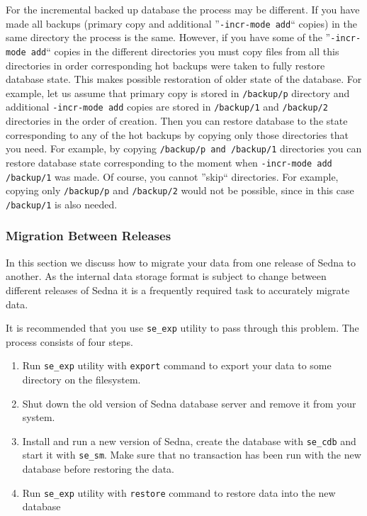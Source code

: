 \documentclass[a4paper,12pt]{article}
\begin{document}
For the incremental backed up database the process may be different. If you have made all backups (primary copy and 
additional ''\verb!-incr-mode add!`` copies) in the same directory the process is the same. However, if you have some of the 
''\verb!-incr-mode add!`` copies in the different directories you must copy files from all this directories 
in order corresponding hot backups were taken to fully restore
database state. This makes possible restoration of older state of the database. For example, let us assume
that primary copy is stored in \verb!/backup/p! directory and additional \verb!-incr-mode add! copies are stored in 
\verb!/backup/1! and \verb!/backup/2! directories in the order of creation. Then you can restore 
database to the state corresponding to any of the hot backups by copying only those directories that you need.
For example, by copying \verb!/backup/p and !\verb!/backup/1! directories you can restore database state corresponding
to the moment when \verb!-incr-mode add /backup/1! was made. Of course, you cannot ''skip`` directories. For example,
copying only \verb!/backup/p! and \verb!/backup/2! would not be possible, since in this case \verb!/backup/1! is also
needed.

\subsubsection{Migration Between Releases}
\label{sec:release-migr}
In this section we discuss how to migrate your data from one release of Sedna to another. 
As the internal data storage format is subject to change between different releases of Sedna it is a 
frequently required task to accurately migrate data.  

It is recommended that you use \verb!se_exp! utility to pass through this problem. The process 
consists of four steps.

\begin{enumerate}
\item
Run \verb!se_exp! utility with \verb!export! command to export your data to some 
directory on the filesystem.
\item
Shut down the old version of Sedna database server and remove it from your system. 
\item
Install and run a new version of Sedna, create the database with \verb!se_cdb! and start it with 
\verb!se_sm!. Make sure that no transaction has been run with the new database before restoring 
the data.
\item
Run \verb!se_exp! utility with \verb!restore! command to restore data into the new database
\end{enumerate}
\end{document}
